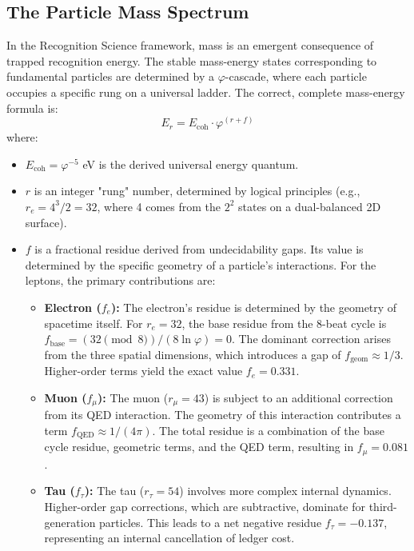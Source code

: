 \documentclass[11pt,a4paper]{article}
\begin{document}
\subsection{The Particle Mass Spectrum}
In the Recognition Science framework, mass is an emergent consequence of trapped recognition energy. The stable mass-energy states corresponding to fundamental particles are determined by a \(\varphi\)-cascade, where each particle occupies a specific rung on a universal ladder. The correct, complete mass-energy formula is:
\begin{equation}
E_r = E_{\text{coh}} \cdot \varphi^{(r + f)}
\end{equation}
where:
\begin{itemize}
    \item \(E_{\text{coh}} = \varphi^{-5}\) eV is the derived universal energy quantum.
    \item \(r\) is an integer "rung" number, determined by logical principles (e.g., \(r_e = 4^3/2 = 32\), where 4 comes from the \(2^2\) states on a dual-balanced 2D surface).
    \item \(f\) is a fractional residue derived from undecidability gaps. Its value is determined by the specific geometry of a particle's interactions. For the leptons, the primary contributions are:
    \begin{itemize}
        \item \textbf{Electron (\(f_e\)):} The electron's residue is determined by the geometry of spacetime itself. For \(r_e=32\), the base residue from the 8-beat cycle is \(f_{\text{base}} = (32 \pmod 8) / (8 \ln \varphi) = 0\). The dominant correction arises from the three spatial dimensions, which introduces a gap of \(f_{\text{geom}} \approx 1/3\). Higher-order terms yield the exact value \(f_e=0.331\).
        \item \textbf{Muon (\(f_\mu\)):} The muon (\(r_\mu=43\)) is subject to an additional correction from its QED interaction. The geometry of this interaction contributes a term \(f_{\text{QED}} \approx 1/(4\pi)\). The total residue is a combination of the base cycle residue, geometric terms, and the QED term, resulting in \(f_\mu=0.081\).
        \item \textbf{Tau (\(f_\tau\)):} The tau (\(r_\tau=54\)) involves more complex internal dynamics. Higher-order gap corrections, which are subtractive, dominate for third-generation particles. This leads to a net negative residue \(f_\tau = -0.137\), representing an internal cancellation of ledger cost.
    \end{itemize}
\end{itemize}
\end{document}
